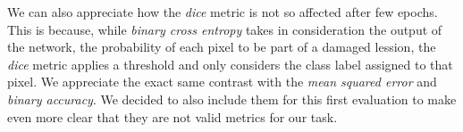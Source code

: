 \begin{figure}[!htb]
    \hfill
    \hfill
    \hfill
    \hfill
\end{figure}

We can also appreciate how the \textit{dice} metric is not so affected after few epochs. This is because, while \textit{binary cross entropy} takes in consideration the output of the network, the probability of each pixel to be part of a damaged lession, the \textit{dice} metric applies a threshold and only considers the class label assigned to that pixel. We appreciate the exact same contrast with the \textit{mean squared error} and \textit{binary accuracy}. We decided to also include them for this first evaluation to make even more clear that they are not valid metrics for our task.

